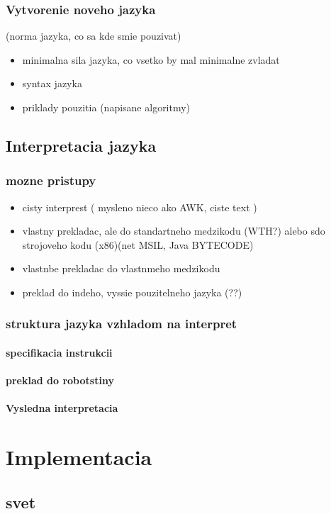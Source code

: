\documentclass[12pt,notitlepage]{report}
\begin{document}
\subsection{Vytvorenie noveho jazyka} (norma jazyka, co sa kde smie pouzivat)
\begin{itemize}
\item minimalna sila jazyka, co vsetko by mal minimalne zvladat
\item syntax jazyka
\item priklady pouzitia (napisane algoritmy)
\end{itemize}
\section {Interpretacia jazyka}
\subsection{mozne pristupy}
\begin{itemize}
\item cisty interprest ( mysleno nieco ako AWK, ciste text )
\item vlastny prekladac, ale do standartneho medzikodu (WTH?) alebo sdo strojoveho kodu (x86)(net MSIL, Java BYTECODE)
\item vlastnbe prekladac do vlastnmeho medzikodu
\item preklad do indeho, vyssie pouzitelneho jazyka  (??)
\end{itemize}
\subsection{struktura jazyka vzhladom na interpret}
\subsubsection{specifikacia instrukcii}
\subsubsection{preklad do robotstiny}
\subsubsection{Vysledna interpretacia}
\chapter{Implementacia}
\section{svet}
\end{document}
